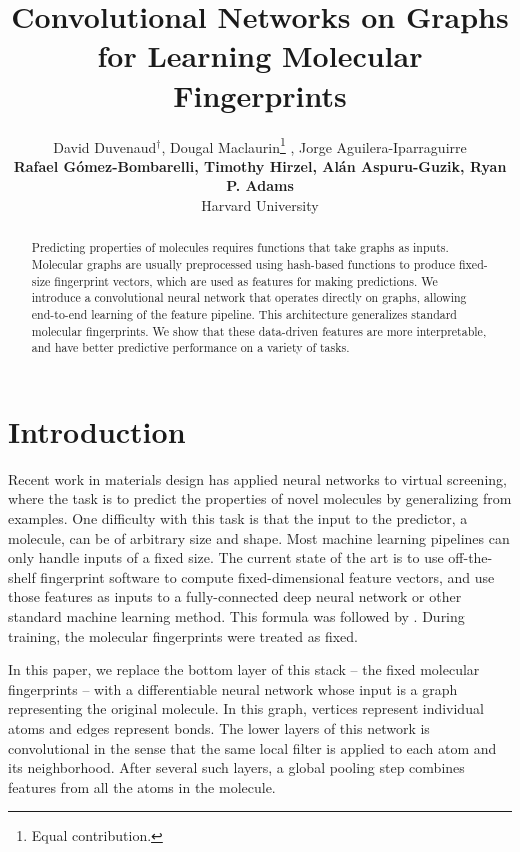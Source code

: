 \documentclass{article}
\title{Convolutional Networks on Graphs \\for Learning Molecular Fingerprints}
\author{
David Duvenaud$^\dagger$, Dougal Maclaurin\thanks{Equal contribution.} , Jorge Aguilera-Iparraguirre \\ {\bf Rafael G\'omez-Bombarelli, Timothy Hirzel, Al\'an Aspuru-Guzik, Ryan P. Adams}\\
Harvard University}
\newcommand{\citet}{\cite}
\begin{document}
\maketitle

\begin{abstract}
Predicting properties of molecules requires functions that take graphs as inputs.
Molecular graphs are usually preprocessed using hash-based functions to produce fixed-size fingerprint vectors, which are used as features for making predictions.
We introduce a convolutional neural network that operates directly on graphs, allowing end-to-end learning of the feature pipeline.
This architecture generalizes standard molecular fingerprints.
We show that these data-driven features are more interpretable, and have better predictive performance on a variety of tasks.
\end{abstract}

\section{Introduction}
Recent work in materials design has applied neural networks to virtual screening, where the task is to predict the properties of novel molecules by generalizing from examples.
One difficulty with this task is that the input to the predictor, a molecule, can be of arbitrary size and shape.
Most machine learning pipelines can only handle inputs of a fixed size.
The current state of the art is to use off-the-shelf fingerprint software to compute fixed-dimensional feature vectors, and use those features as inputs to a fully-connected deep neural network or other standard machine learning method.
This formula was followed by \citet{unterthinerdeep, dahl2014multi, ramsundar2015massively}.
During training, the molecular fingerprints were treated as fixed.

In this paper, we replace the bottom layer of this stack -- the fixed molecular fingerprints -- with a differentiable neural network whose input is a graph representing the original molecule.
In this graph, vertices represent individual atoms and edges represent bonds.
The lower layers of this network is convolutional in the sense that the same local filter is applied to each atom and its neighborhood.
After several such layers, a global pooling step combines features from all the atoms in the molecule.
\end{document}
